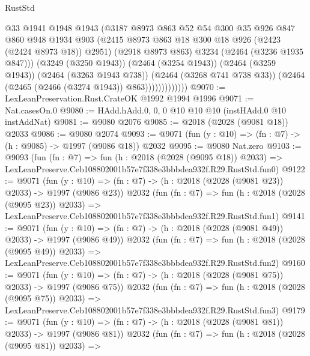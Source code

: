 \begin{lexlean}{RustStd}
\begin{coremodule}
                          @33
                          @1941
                          @1948
                          @1943
                          (@3187
                            @8973
                            @863
                            @52
                            @54
                            @300
                            @35
                            @926
                            @847
                            @860
                            @948
                            @1934
                            @903
                            (@2415 @8973 @863 @18 @300 @18 @926 (@2423 (@2424 @8973 @18)) @2951)
                            (@2918 @8973 @863)
                            @3234
                            (@2464 (@3236 @1935 @847)))
                          (@3249 (@3250 @1943))
                          (@2464 (@3254 @1943))
                          (@2464 (@3259 @1943))
                          (@2464 (@3263 @1943 @738))
                          (@2464 (@3268 @741 @738 @33))
                          (@2464 (@2465 (@2466 (@3274 @1943)) @863)))))))))))))
@9070 := LexLeanPreservation.Rust.CrateOK @1992 @1994 @1996
@9071 := Nat.casesOn.{0}
@9080 := HAdd.hAdd.{0, 0, 0} @10 @10 @10 (instHAdd.{0} @10 instAddNat)
@9081 := @9080 @2076
@9085 := @2018 (@2028 (@9081 @18)) @2033
@9086 := @9080 @2074
@9093 := @9071 (fun (y : @10) => (fn : @7) -> (h : @9085) -> @1997 (@9086 @18)) @2032
@9095 := @9080 Nat.zero
@9103 := @9093
    (fun (fn : @7) =>
    fun (h : @2018 (@2028 (@9095 @18)) @2033) =>
    LexLeanPreserve.Ceb108802001b57e7f338e3bbbdea932f.R29.RustStd.fun0)
@9122 := @9071
    (fun (y : @10) => (fn : @7) -> (h : @2018 (@2028 (@9081 @23)) @2033) -> @1997 (@9086 @23))
    @2032
    (fun (fn : @7) =>
    fun (h : @2018 (@2028 (@9095 @23)) @2033) =>
    LexLeanPreserve.Ceb108802001b57e7f338e3bbbdea932f.R29.RustStd.fun1)
@9141 := @9071
    (fun (y : @10) => (fn : @7) -> (h : @2018 (@2028 (@9081 @49)) @2033) -> @1997 (@9086 @49))
    @2032
    (fun (fn : @7) =>
    fun (h : @2018 (@2028 (@9095 @49)) @2033) =>
    LexLeanPreserve.Ceb108802001b57e7f338e3bbbdea932f.R29.RustStd.fun2)
@9160 := @9071
    (fun (y : @10) => (fn : @7) -> (h : @2018 (@2028 (@9081 @75)) @2033) -> @1997 (@9086 @75))
    @2032
    (fun (fn : @7) =>
    fun (h : @2018 (@2028 (@9095 @75)) @2033) =>
    LexLeanPreserve.Ceb108802001b57e7f338e3bbbdea932f.R29.RustStd.fun3)
@9179 := @9071
    (fun (y : @10) => (fn : @7) -> (h : @2018 (@2028 (@9081 @81)) @2033) -> @1997 (@9086 @81))
    @2032
    (fun (fn : @7) =>
    fun (h : @2018 (@2028 (@9095 @81)) @2033) =>

\end{coremodule}
\end{lexlean}
